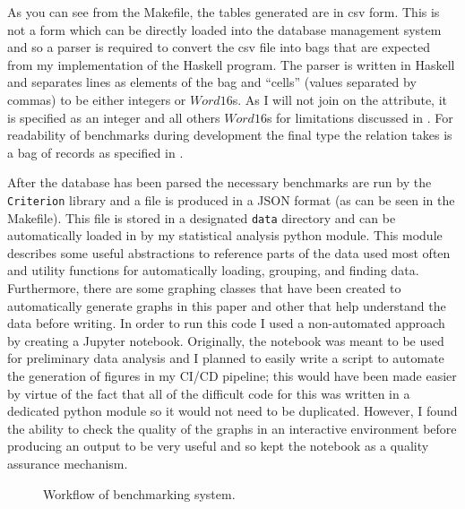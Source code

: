 As you can see from the Makefile, the tables generated are in csv form. This is
not a form which can be directly loaded into the database management system and
so a parser is required to convert the csv file into bags that are expected from
my implementation of the Haskell program. The parser is written in Haskell and
separates lines as elements of the bag and ``cells'' (values separated by
commas) to be either integers or $Word16$s. As I will not join on the
 attribute, it is specified as an integer and all
others $Word16$s for limitations discussed in . For
readability of benchmarks during development the final type the
 relation takes is a bag of records as specified in
.

After the database has been parsed the necessary benchmarks are run by the
\verb|Criterion| library and a file is produced in a JSON format (as can be seen
in the Makefile). This file is stored in a designated \verb|data| directory and
can be automatically loaded in by my statistical analysis python module. This
module describes some useful abstractions to reference parts of the data used
most often and utility functions for automatically loading, grouping, and finding
data. Furthermore, there are some graphing classes that have been created to
automatically generate graphs in this paper and other that help understand the
data before writing. In order to run this code I used a non-automated approach
by creating a Jupyter notebook. Originally, the notebook was meant to be used for
preliminary data analysis and I planned to easily write a script to automate the
generation of figures in my CI/CD pipeline; this would have been made easier by virtue of the fact that 
all of the difficult code for this was written in a dedicated python module so
it would not
need to be duplicated. However, I found the ability to check the quality of the
graphs in an interactive environment before producing an output to be very
useful and so kept the notebook as a quality assurance mechanism.

\begin{figure}[h]
    \centering
    \caption{Workflow of benchmarking system.}
    \label{fig:benchmark:workflow}
\end{figure}
